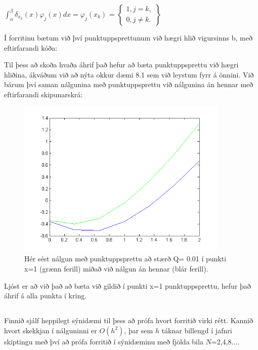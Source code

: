 \documentclass[11pt,a4paper,titlepage]{article}
\begin{document}
\begin{center}$\int_{\alpha}^{\beta}\delta_{x_{k}}(x)\varphi_{j}(x)dx = \varphi_{j}(x_{k})$
=
$\begin{Bmatrix}
1, j=k,
\\ 
0, j \neq k .
\end{Bmatrix}$\end{center}

Í forritinu bætum við því punktuppsprettunum við hægri hlið vigursinns b, með eftirfarandi kóða: 



Til þess að skoða hvaða áhrif það hefur að bæta punktuppsprettu við hægri hliðina, ákváðum við að nýta okkur dæmi 8.1 sem við leystum fyrr á önnini.
Við bárum því saman nálgunina með punktuppsprettu við nálgunina án hennar með eftirfarandi skipunarskrá:
 
 \begin{figure}[H]
 	\centering
 	\includegraphics[width=0.9\textwidth]{mynd1_3.png}
 	\caption{Hér sést nálgun með punktuppsprettu að stærð Q= 0.01 í punkti x=1 (grænn ferill) miðað við nálgun án hennar (blár ferill). }
 	\label{fig:awesome_image1}
 \end{figure}
Ljóst er að við það að bæta við gildið í punkti x=1 punktuppsprettu, hefur það áhrif á alla punkta í kring.

\subsection{}
Finnið sjálf heppilegt sýnidæmi til þess að prófa hvort forritið virki rétt. Kannið hvort skekkjan í nálguninni er $O(h^2)$, þar sem $h$ táknar billengd í jafnri skiptingu með því að prófa forritið í sýnidæminu með fjölda bila $N$=2,4,8....
\end{document}
